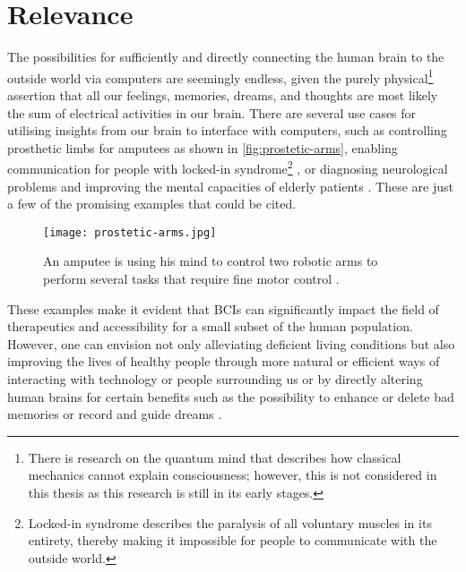 \section{Relevance}
\label{chapter1-relevance}

The possibilities for sufficiently and directly connecting the human brain to the outside world via computers are seemingly endless, given the purely physical\footnote{There is research on the quantum mind that describes how classical mechanics cannot explain consciousness; however, this is not considered in this thesis as this research is still in its early stages.} assertion that all our feelings, memories, dreams, and thoughts are most likely the sum of electrical activities in our brain. There are several use cases for utilising insights from our brain to interface with computers, such as controlling prosthetic limbs for amputees \citep{campbell_amputee_2014} as shown in \autoref{fig:prostetic-arms}, enabling communication for people with locked-in syndrome\footnote{Locked-in syndrome describes the paralysis of all voluntary muscles in its entirety, thereby making it impossible for people to communicate with the outside world.} \citep{chaudhary_spelling_2022}, or diagnosing neurological problems and improving the mental capacities of elderly patients \citep{belkacem_brain_2020}. These are just a few of the promising examples that could be cited.

\begin{figure}[ht]
  \centering
  \texttt{[image: prostetic-arms.jpg]}
  \caption[An amputee is using his mind to control two robotic arms to perform several tasks that require fine motor control.]{An amputee is using his mind to control two robotic arms to perform several tasks that require fine motor control \citep{campbell_amputee_2014}.}
  \label{fig:prostetic-arms}
\end{figure}

These examples make it evident that BCIs can significantly impact the field of therapeutics and accessibility for a small subset of the human population. However, one can envision not only alleviating deficient living conditions but also improving the lives of healthy people through more natural or efficient ways of interacting with technology or people surrounding us or by directly altering human brains for certain benefits such as the possibility to enhance or delete bad memories \citep{spiers_enhance_2014} or record and guide dreams \citep{haar_horowitz_dormio_2020}.


